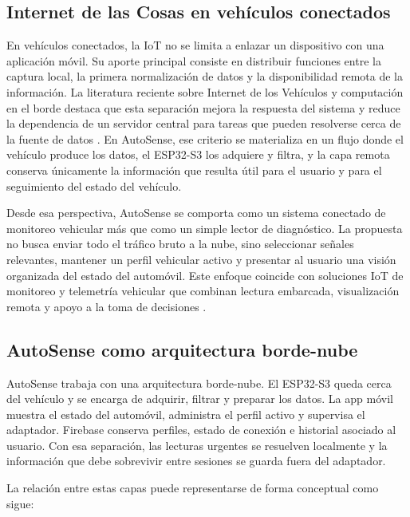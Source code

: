 \documentclass[12pt,letterpaper]{report}
\begin{document}
\subsection{Internet de las Cosas en vehículos conectados}

En vehículos conectados, la IoT no se limita a enlazar un dispositivo con una aplicación móvil. Su aporte principal consiste en distribuir funciones entre la captura local, la primera normalización de datos y la disponibilidad remota de la información. La literatura reciente sobre Internet de los Vehículos y computación en el borde destaca que esta separación mejora la respuesta del sistema y reduce la dependencia de un servidor central para tareas que pueden resolverse cerca de la fuente de datos \cite{zhang2020_iov_edge}. En AutoSense, ese criterio se materializa en un flujo donde el vehículo produce los datos, el ESP32-S3 los adquiere y filtra, y la capa remota conserva únicamente la información que resulta útil para el usuario y para el seguimiento del estado del vehículo.

Desde esa perspectiva, AutoSense se comporta como un sistema conectado de monitoreo vehicular más que como un simple lector de diagnóstico. La propuesta no busca enviar todo el tráfico bruto a la nube, sino seleccionar señales relevantes, mantener un perfil vehicular activo y presentar al usuario una visión organizada del estado del automóvil. Este enfoque coincide con soluciones IoT de monitoreo y telemetría vehicular que combinan lectura embarcada, visualización remota y apoyo a la toma de decisiones \cite{shafi2018_vehicle_remote_health,camposferreira2023_vehicle_driver_monitoring}.

\subsection{AutoSense como arquitectura borde-nube}

AutoSense trabaja con una arquitectura borde-nube. El ESP32-S3 queda cerca del vehículo y se encarga de adquirir, filtrar y preparar los datos. La app móvil muestra el estado del automóvil, administra el perfil activo y supervisa el adaptador. Firebase conserva perfiles, estado de conexión e historial asociado al usuario. Con esa separación, las lecturas urgentes se resuelven localmente y la información que debe sobrevivir entre sesiones se guarda fuera del adaptador.

La relación entre estas capas puede representarse de forma conceptual como sigue:
\end{document}
